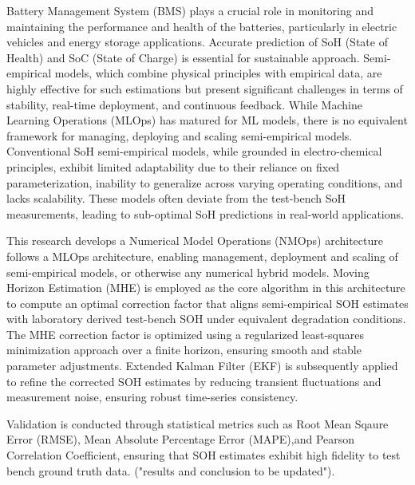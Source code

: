 

Battery Management System (BMS) plays a crucial role in monitoring and maintaining the performance and health of the batteries, particularly in electric vehicles and energy storage applications. Accurate prediction of SoH (State of Health) and SoC (State of Charge) is essential for sustainable approach. Semi-empirical models, which combine physical principles with empirical data, are highly effective for such estimations but present significant challenges in terms of stability, real-time deployment, and continuous feedback. While Machine Learning Operations (MLOps) has matured for ML models, there is no equivalent framework for managing, deploying and scaling semi-empirical models. Conventional SoH semi-empirical models, while grounded in electro-chemical principles, exhibit limited adaptability due to their reliance on fixed parameterization, inability to generalize across varying operating conditions, and lacks scalability. These models often deviate from the test-bench SoH measurements, leading to sub-optimal SoH predictions in real-world applications. 

This research develops a Numerical Model Operations (NMOps) architecture follows a MLOps architecture, enabling management, deployment and scaling of semi-empirical models, or otherwise any numerical hybrid models. Moving Horizon Estimation (MHE) is employed as the core algorithm in this architecture to compute an optimal correction factor that aligns semi-empirical SOH estimates with laboratory derived test-bench SOH under equivalent degradation conditions. The MHE correction factor is optimized using a regularized least-squares minimization approach over a finite horizon, ensuring smooth and stable parameter adjustments. Extended Kalman Filter (EKF) is subsequently applied to refine the corrected SOH estimates by reducing transient fluctuations and measurement noise, ensuring robust time-series consistency.

Validation is conducted through statistical metrics such as Root Mean Sqaure Error (RMSE), Mean Absolute Percentage Error (MAPE),and Pearson Correlation Coefficient, ensuring that SOH estimates exhibit high fidelity to test bench ground truth data. ("results and conclusion to be updated").
